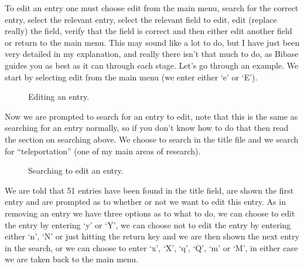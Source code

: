 \documentclass[12pt,a4paper]{book}
\begin{document}
To edit an entry one must choose edit from the main menu, search for the 
correct entry, select the relevant entry, select the relevant field 
to edit, edit (replace really) the field, verify that the field is 
correct and then either edit another field or return to the main 
menu.  This may sound like a lot to do, but I have just been very 
detailed in my explanation, and really there isn't that much to do, 
as Bibase guides you as best as it can through each stage.  Let's go 
through an example.  We start by selecting edit from the main menu (we 
enter either `e' or `E').
\begin{figure}[!ht]
\centerline{}
\caption{Editing an entry.}
\label{fig:edit}
\end{figure}
Now we are prompted to search for an entry to edit, note that this is 
the same as searching for an entry normally, so if you don't know how 
to do that then read the section on searching above.  We choose to 
search in the title file and we search for ``teleportation'' (one of 
my main areas of research).  
\begin{figure}[!ht]
\centerline{}
\caption{Searching to edit an entry.}
\label{fig:searchToEdit}
\end{figure}
We are told that 51 entries have been found in the title field, are 
shown the first entry and are prompted as to whether or not we want 
to edit this entry.  As in removing an entry we have three options as 
to what to do, we can choose to edit the entry by entering `y' or 
`Y', we can choose not to edit the entry by entering either `n', `N' 
or just hitting the return key and we are then shown the next entry in 
the search, or we can choose to enter `x', `X', `q', `Q', `m' or `M', 
in either case we are taken back to the main menu.
\end{document}
